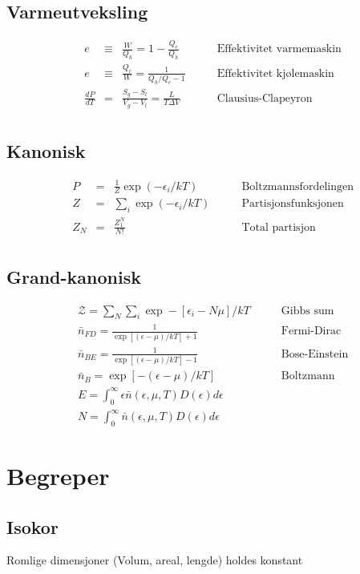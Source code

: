 \documentclass{article}
\begin{document}
\begin{multicols}{2}
\subsection*{Varmeutveksling}
$$\begin{aligned}
&e&\equiv&\frac{W}{Q_h}=1-\frac{Q_c}{Q_h}\qquad&\text{Effektivitet varmemaskin}\\
&e&\equiv&\frac{Q_c}{W}=\frac{1}{Q_h/Q_c-1}\qquad&\text{Effektivitet kj{\o}lemaskin}\\
&\frac{dP}{dT}&=&\frac{S_g-S_l}{V_g-V_l}=\frac{L}{T\Delta V}\qquad&\text{Clausius-Clapeyron}\\
\end{aligned}$$
\subsection*{Kanonisk}
$$\begin{aligned}
&P&=&\frac{1}{Z}\exp(-\epsilon_i/kT)\qquad&\text{Boltzmannsfordelingen}\\
&Z&=&\sum_i\exp(-\epsilon_i/kT)\qquad&\text{Partisjonsfunksjonen}\\
&Z_N&=&\frac{Z_1^N}{N!}\qquad&\text{Total partisjon}\\
\end{aligned}$$
\subsection*{Grand-kanonisk}
$$\begin{aligned}
&\mathcal{Z}=\sum_N\sum_i \exp-[\epsilon_i-N\mu]/kT\qquad&\text{Gibbs sum}\\
&\bar{n}_{FD}=\frac{1}{\exp[(\epsilon-\mu)/kT]+1}\qquad&\text{Fermi-Dirac}\\
&\bar{n}_{BE}=\frac{1}{\exp[(\epsilon-\mu)/kT]-1}\qquad&\text{Bose-Einstein}\\
&\bar{n}_{B}=\exp[-(\epsilon-\mu)/kT]\qquad&\text{Boltzmann}\\
&E=\int_0^{\infty}\epsilon\bar{n}(\epsilon,\mu,T)D(\epsilon)d\epsilon\\
&N=\int_0^{\infty}\bar{n}(\epsilon,\mu,T)D(\epsilon)d\epsilon
\end{aligned}$$


\section*{Begreper}
\subsection*{Isokor}
Romlige dimensjoner (Volum, areal, lengde) holdes konstant

\end{multicols}
\end{document}
